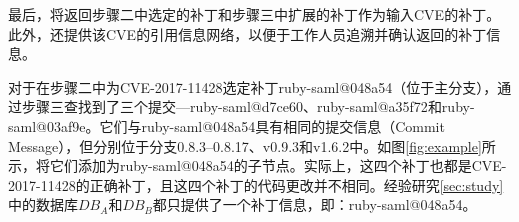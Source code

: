 最后，\tool 将返回步骤二中选定的补丁和步骤三中扩展的补丁作为输入CVE的补丁。此外，\tool 还提供该CVE的引用信息网络，以便于工作人员追溯并确认返回的补丁信息。

\begin{exmp}
对于在步骤二中为CVE-2017-11428选定补丁ruby-saml@048a54（位于主分支），\tool 通过步骤三查找到了三个提交---ruby-saml@d7ce60\cite{ruby-saml-2}、ruby-saml@a35f72\cite{ruby-saml-3}和ruby-saml@03af9e\cite{ruby-saml-4}。它们与ruby-saml@048a54具有相同的提交信息（Commit Message），但分别位于分支0.8.3--0.8.17、v0.9.3和v1.6.2中。如图\ref{fig:example}所示，\tool 将它们添加为ruby-saml@048a54的子节点。实际上，这四个补丁也都是CVE-2017-11428的正确补丁，且这四个补丁的代码更改并不相同。经验研究\ref{sec:study}中的数据库$DB_A$和$DB_B$都只提供了一个补丁信息，即：ruby-saml@048a54。
\end{exmp}
